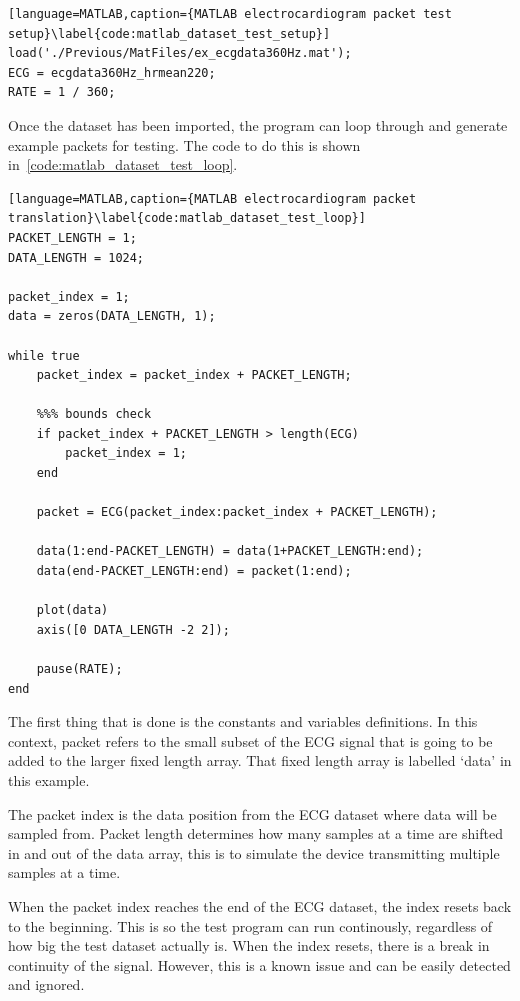 \begin{lstlisting}[language=MATLAB,caption={MATLAB electrocardiogram packet test setup}\label{code:matlab_dataset_test_setup}]
load('./Previous/MatFiles/ex_ecgdata360Hz.mat');
ECG = ecgdata360Hz_hrmean220;
RATE = 1 / 360;
\end{lstlisting}

Once the dataset has been imported, the program can loop through and generate example packets for testing.
The code to do this is shown in~\autoref{code:matlab_dataset_test_loop}.

\begin{lstlisting}[language=MATLAB,caption={MATLAB electrocardiogram packet translation}\label{code:matlab_dataset_test_loop}]
PACKET_LENGTH = 1;
DATA_LENGTH = 1024;

packet_index = 1;
data = zeros(DATA_LENGTH, 1);

while true
    packet_index = packet_index + PACKET_LENGTH;

    %%% bounds check
    if packet_index + PACKET_LENGTH > length(ECG)
        packet_index = 1;
    end

    packet = ECG(packet_index:packet_index + PACKET_LENGTH);

    data(1:end-PACKET_LENGTH) = data(1+PACKET_LENGTH:end);
    data(end-PACKET_LENGTH:end) = packet(1:end);

    plot(data)
    axis([0 DATA_LENGTH -2 2]);

    pause(RATE);
end
\end{lstlisting}

The first thing that is done is the constants and variables definitions.
In this context, packet refers to the small subset of the ECG signal that is going to be added to the larger fixed length array.
That fixed length array is labelled `data' in this example.

The packet index is the data position from the ECG dataset where data will be sampled from.
Packet length determines how many samples at a time are shifted in and out of the data array,
this is to simulate the device transmitting multiple samples at a time.

When the packet index reaches the end of the ECG dataset, the index resets back to the beginning.
This is so the test program can run continously, regardless of how big the test dataset actually is.
When the index resets, there is a break in continuity of the signal. However, this is a known issue and can be easily detected and ignored.

